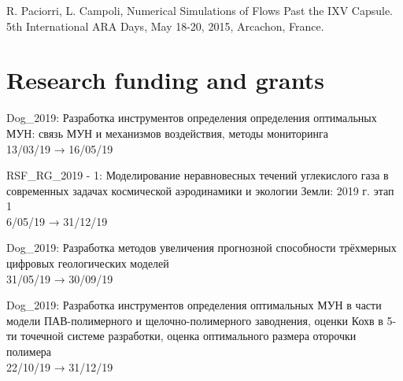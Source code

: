\documentclass[11pt]{res} %
\begin{document}
\begin{resume}
R. Paciorri, L. Campoli, Numerical Simulations of Flows Past the IXV Capsule. 5th International ARA Days, May 18-20, 2015, Arcachon, France.

\section{{Research funding and grants}}
Dog\_2019: Разработка инструментов определения определения оптимальных МУН: связь МУН и механизмов воздействия, методы мониторинга \\
13/03/19 → 16/05/19

RSF\_RG\_2019 - 1: Моделирование неравновесных течений углекислого газа в современных задачах космической аэродинамики и экологии Земли: 2019 г. этап 1 \\
6/05/19 → 31/12/19

Dog\_2019: Разработка методов увеличения прогнозной способности трёхмерных цифровых геологических моделей \\
31/05/19 → 30/09/19

Dog\_2019: Разработка инструментов определения оптимальных МУН в части модели ПАВ-полимерного и щелочно-полимерного заводнения, оценки Кохв в 5-ти точечной системе разработки, оценка оптимального размера оторочки полимера \\
22/10/19 → 31/12/19


\end{resume}
\end{document}
